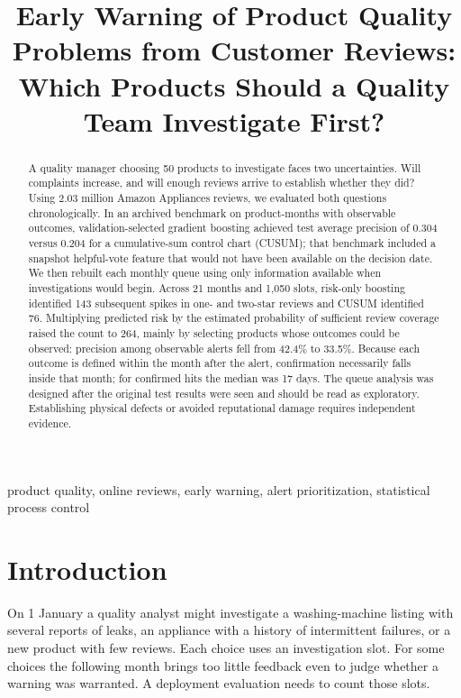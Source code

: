 \documentclass[conference]{IEEEtran}
\begin{document}
\title{Early Warning of Product Quality Problems from Customer Reviews:\\
Which Products Should a Quality Team Investigate First?}

\author{
}

\maketitle

\begin{abstract}
A quality manager choosing 50 products to investigate faces two uncertainties. Will complaints increase, and will enough reviews arrive to establish whether they did? Using 2.03 million Amazon Appliances reviews, we evaluated both questions chronologically. In an archived benchmark on product-months with observable outcomes, validation-selected gradient boosting achieved test average precision of 0.304 versus 0.204 for a cumulative-sum control chart (CUSUM); that benchmark included a snapshot helpful-vote feature that would not have been available on the decision date. We then rebuilt each monthly queue using only information available when investigations would begin. Across 21 months and 1,050 slots, risk-only boosting identified 143 subsequent spikes in one- and two-star reviews and CUSUM identified 76. Multiplying predicted risk by the estimated probability of sufficient review coverage raised the count to 264, mainly by selecting products whose outcomes could be observed: precision among observable alerts fell from 42.4\% to 33.5\%. Because each outcome is defined within the month after the alert, confirmation necessarily falls inside that month; for confirmed hits the median was 17 days. The queue analysis was designed after the original test results were seen and should be read as exploratory. Establishing physical defects or avoided reputational damage requires independent evidence.
\end{abstract}

\begin{IEEEkeywords}
product quality, online reviews, early warning, alert prioritization, statistical process control
\end{IEEEkeywords}

\section{Introduction}
On 1 January a quality analyst might investigate a washing-machine listing with several reports of leaks, an appliance with a history of intermittent failures, or a new product with few reviews. Each choice uses an investigation slot. For some choices the following month brings too little feedback even to judge whether a warning was warranted. A deployment evaluation needs to count those slots.
\end{document}
